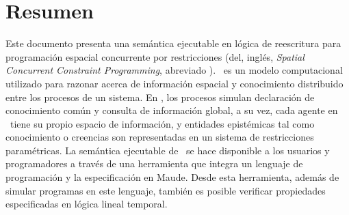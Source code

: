 
\chapter*{Resumen}

Este documento presenta una sem\'antica ejecutable en l\'ogica de reescritura para programaci\'on espacial concurrente por restricciones (del, ingl\'es, \textit{Spatial Concurrent Constraint Programming}, abreviado \SCCP). \SCCP \ es un modelo computacional utilizado para razonar acerca de informaci\'on espacial y conocimiento distribuido entre los procesos de un sistema. En \SCCP, los procesos simulan declaraci\'on de conocimiento com\'un  y consulta de informaci\'on global, a su vez, cada agente en \SCCP \  tiene su propio espacio de informaci\'on, y entidades epist\'emicas tal como conocimiento o creencias son representadas en un sistema de restricciones param\'etricas. La sem\'antica ejecutable de \SCCP \ se hace disponible a los usuarios y programadores a trav\'es de una herramienta que integra un lenguaje de programaci\'on y la especificaci\'on en Maude. Desde esta herramienta, adem\'as de simular programas en este lenguaje, tambi\'en es posible verificar propiedades especificadas en l\'ogica lineal temporal.